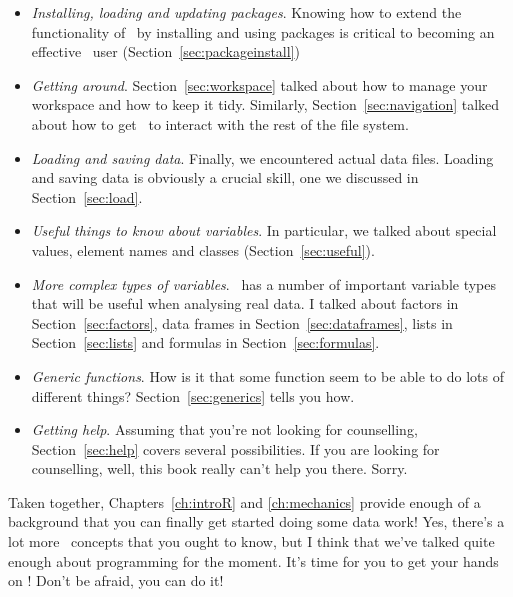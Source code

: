 \begin{itemize}
\item {\it Installing, loading and updating packages}. Knowing how to extend the functionality of \R\ by installing and using packages is critical to becoming an effective \R\ user (Section~\ref{sec:packageinstall})
\item {\it Getting around}. Section~\ref{sec:workspace} talked about how to manage your workspace and how to keep it tidy. Similarly, Section~\ref{sec:navigation} talked about how to get \R\ to interact with the rest of the file system.
\item {\it Loading and saving data}. Finally, we encountered actual data files. Loading and saving data is obviously a crucial skill, one we discussed in Section~\ref{sec:load}.
\item {\it Useful things to know about variables}. In particular, we talked about special values, element names and classes (Section~\ref{sec:useful}).
\item {\it More complex types of variables}. \R\ has a number of important variable types that will be useful when analysing real data. I talked about factors in Section~\ref{sec:factors}, data frames in Section~\ref{sec:dataframes}, lists in Section~\ref{sec:lists} and formulas in Section~\ref{sec:formulas}.
\item {\it Generic functions}. How is it that some function seem to be able to do lots of different things? Section~\ref{sec:generics} tells you how.
\item {\it Getting help}. Assuming that you're not looking for counselling, Section~\ref{sec:help} covers several possibilities. If you are looking for counselling, well, this book really can't help you there. Sorry. 
\end{itemize}

\noindent
Taken together, Chapters~\ref{ch:introR} and \ref{ch:mechanics} provide enough of a background that you can finally get started doing some data work! Yes, there's a lot more \R\ concepts that you ought to know, but I think that we've talked quite enough about programming for the moment. It's time for you to get your hands on \R! Don't be afraid, you can do it!

